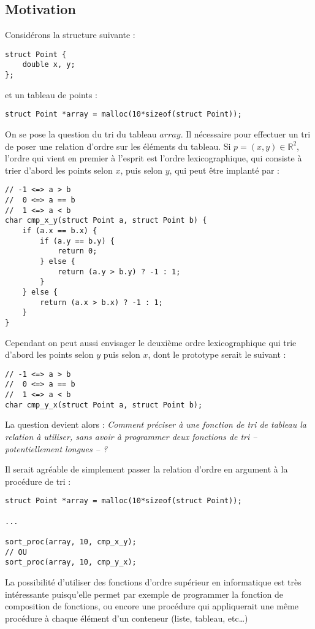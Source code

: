 \documentclass[../../../main.tex]{subfiles}
\begin{document}
\subsection{Motivation}
\label{sub:motivation_pointeurs_routines}
Considérons la structure suivante :
\begin{verbatim}
struct Point {
	double x, y;
};
\end{verbatim}
et un tableau de points :
\begin{verbatim}
struct Point *array = malloc(10*sizeof(struct Point));
\end{verbatim}
On se pose la question du tri du tableau $array$. Il nécessaire pour effectuer un tri de poser une relation d'ordre sur les éléments du tableau. Si $p = (x, y)\in\mathbb{R}^{2}$, l'ordre qui vient en premier à l'esprit est l'ordre lexicographique, qui consiste à trier d'abord les points selon $x$, puis selon $y$, qui peut être implanté par :
\begin{verbatim}
// -1 <=> a > b
//  0 <=> a == b
//  1 <=> a < b
char cmp_x_y(struct Point a, struct Point b) {
	if (a.x == b.x) {
		if (a.y == b.y) {
			return 0;
		} else {
			return (a.y > b.y) ? -1 : 1;
		}
	} else {
		return (a.x > b.x) ? -1 : 1;
	}
}
\end{verbatim}
Cependant on peut aussi envisager le deuxième ordre lexicographique qui trie d'abord les points selon $y$ puis selon $x$, dont le prototype serait le suivant :
\begin{verbatim}
// -1 <=> a > b
//  0 <=> a == b
//  1 <=> a < b
char cmp_y_x(struct Point a, struct Point b);
\end{verbatim}
La question devient alors : \textit{Comment préciser à une fonction de tri de tableau la relation à utiliser, sans avoir à programmer deux fonctions de tri -- potentiellement longues -- ?}

Il serait agréable de simplement passer la relation d'ordre en argument à la procédure de tri :
\begin{verbatim}
struct Point *array = malloc(10*sizeof(struct Point));

...

sort_proc(array, 10, cmp_x_y);
// OU
sort_proc(array, 10, cmp_y_x);
\end{verbatim}
La possibilité d'utiliser des fonctions d'ordre supérieur en informatique est très intéressante puisqu'elle permet par exemple de programmer la fonction de composition de fonctions, ou encore une procédure qui appliquerait une même procédure à chaque élément d'un conteneur (liste, tableau, etc\dots)
\end{document}
